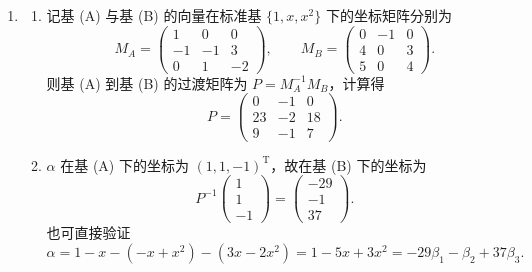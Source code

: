\begin{enumerate}
    将三个行列式均按第一行展开，并记三个行列式的代数余子式 $A_{11} = c_1, A_{12} = c_2, A_{13} = c_3$，则有方程组
    \[
        \begin{cases}
            c_1 + c_2 + c_3 = 1\\
            c_1 + 2c_2 - 5c_3 = 2\\
            2c_1 + 3c_2 + bc_3 = a
        \end{cases}
    \]
    整理有 $(b+4)c_3 = a-3$，故 $a=3, b=-4$.

    待定系数可得所求为 $-\begin{vmatrix}
        1 & -1 & 13 \\
        x & y & z \\
        u & v & w
    \end{vmatrix} = -c_1 + c_2 - 13c_3 = 2(c_1 + 2c_2 - 5c_3) - 3(c_1 + c_2 + c_3) = 1$.

    \item
    \begin{enumerate}
        \item 记基 (A) 与基 (B) 的向量在标准基 $\{1,x,x^2\}$ 下的坐标矩阵分别为
        \[
            M_A=\begin{pmatrix}
                1&0&0\\
                -1&-1&3\\
                0&1&-2
            \end{pmatrix},\qquad
            M_B=\begin{pmatrix}
                0&-1&0\\
                4&0&3\\
                5&0&4
            \end{pmatrix}.
        \]
        则基 (A) 到基 (B) 的过渡矩阵为 $P=M_A^{-1}M_B$，计算得
        \[
            P=\begin{pmatrix}
                0&-1&0\\
                23&-2&18\\
                9&-1&7
            \end{pmatrix}.
        \]

        \item $\alpha$ 在基 (A) 下的坐标为 $(1,1,-1)^\mathrm{T}$，故在基 (B) 下的坐标为
        \[
            P^{-1}\begin{pmatrix}1\\1\\-1\end{pmatrix}
            =\begin{pmatrix}-29\\-1\\37\end{pmatrix}.
        \]
        也可直接验证
        \[
            \alpha=1-x-(-x+x^2)-(3x-2x^2)=1-5x+3x^2
            =-29\beta_1-\beta_2+37\beta_3.
        \]
    \end{enumerate}


\end{enumerate}
